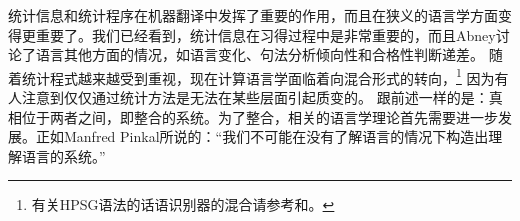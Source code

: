 统计信息和统计程序在机器翻译中发挥了重要的作用，而且在狭义的语言学方面变得更重要了\citep{Abney96a}。我们已经看到，统计信息在习得过程中是非常重要的，而且Abney讨论了语言其他方面的情况，如语言变化、句法分析倾向性和合格性判断递差。
随着统计程式越来越受到重视，现在计算语言学面临着向混合形式的转向，\footnote{%
有关HPSG语法的话语识别器的混合请参考和。
}
因为有人注意到仅仅通过统计方法是无法在某些层面引起质变的\citep{Steedman2011a,Church2011a,Kay2011a}。
跟前述一样的是：真相位于两者之间，即整合的系统。为了整合，相关的语言学理论首先需要进一步发展。正如Manfred Pinkal所说的：“我们不可能在没有了解语言的情况下构造出理解语言的系统。”


